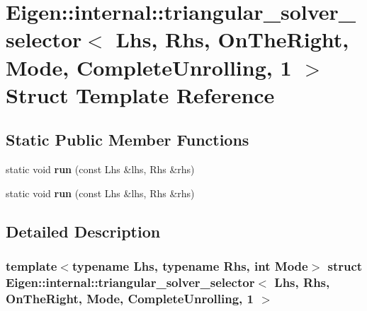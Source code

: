 \hypertarget{struct_eigen_1_1internal_1_1triangular__solver__selector_3_01_lhs_00_01_rhs_00_01_on_the_right_0718422e7095664eb478cc4024fd5b399}{}\section{Eigen\+:\+:internal\+:\+:triangular\+\_\+solver\+\_\+selector$<$ Lhs, Rhs, On\+The\+Right, Mode, Complete\+Unrolling, 1 $>$ Struct Template Reference}
\label{struct_eigen_1_1internal_1_1triangular__solver__selector_3_01_lhs_00_01_rhs_00_01_on_the_right_0718422e7095664eb478cc4024fd5b399}
\subsection*{Static Public Member Functions}
\begin{DoxyCompactItemize}
\item 
\mbox{\label{struct_eigen_1_1internal_1_1triangular__solver__selector_3_01_lhs_00_01_rhs_00_01_on_the_right_0718422e7095664eb478cc4024fd5b399_aace287bcfd7484d61cfd1acf0b686495}} 
static void {\bfseries run} (const Lhs \&lhs, Rhs \&rhs)
\item 
\mbox{\label{struct_eigen_1_1internal_1_1triangular__solver__selector_3_01_lhs_00_01_rhs_00_01_on_the_right_0718422e7095664eb478cc4024fd5b399_aace287bcfd7484d61cfd1acf0b686495}} 
static void {\bfseries run} (const Lhs \&lhs, Rhs \&rhs)
\end{DoxyCompactItemize}


\subsection{Detailed Description}
\subsubsection*{template$<$typename Lhs, typename Rhs, int Mode$>$\newline
struct Eigen\+::internal\+::triangular\+\_\+solver\+\_\+selector$<$ Lhs, Rhs, On\+The\+Right, Mode, Complete\+Unrolling, 1 $>$}



